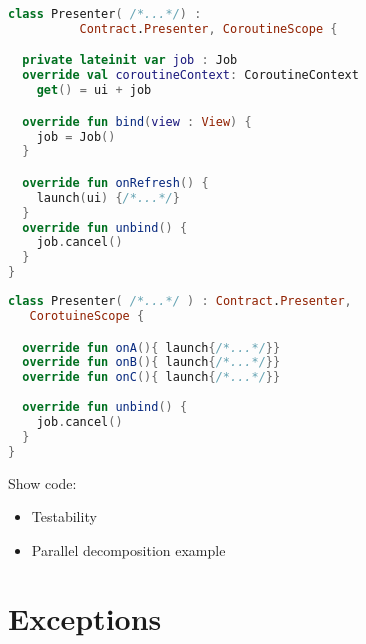 \documentclass[10pt]{beamer}
\begin{document}
\begin{frame}[fragile]
\begin{lstlisting}[language=Kotlin, basicstyle=\ttfamily]
class Presenter( /*...*/) : 
          Contract.Presenter, CoroutineScope {

  private lateinit var job : Job
  override val coroutineContext: CoroutineContext
    get() = ui + job

  override fun bind(view : View) {
    job = Job()  
  }

  override fun onRefresh() {
    launch(ui) {/*...*/}
  }
  override fun unbind() {
    job.cancel()
  }
}
\end{lstlisting}
\end{frame}
\begin{frame}[fragile]
\begin{lstlisting}[language=Kotlin, basicstyle=\ttfamily]
class Presenter( /*...*/ ) : Contract.Presenter,
   CorotuineScope {

  override fun onA(){ launch{/*...*/}}
  override fun onB(){ launch{/*...*/}}
  override fun onC(){ launch{/*...*/}}
  
  override fun unbind() {
    job.cancel() 
  }
}
\end{lstlisting}
\end{frame}

\begin{frame}[fragile]
Show code:
\begin{itemize}
\item Testability 
\item Parallel decomposition example 
\end{itemize}
\end{frame}


\section{Exceptions}

\begin{frame}[fragile]
\begin{lstlisting}[language=Kotlin, basicstyle=\ttfamily]
\end{lstlisting}
\end{frame}


\begin{frame}[fragile]
\begin{lstlisting}[language=Kotlin, basicstyle=\ttfamily]
\end{lstlisting}
\end{frame}
\end{document}
